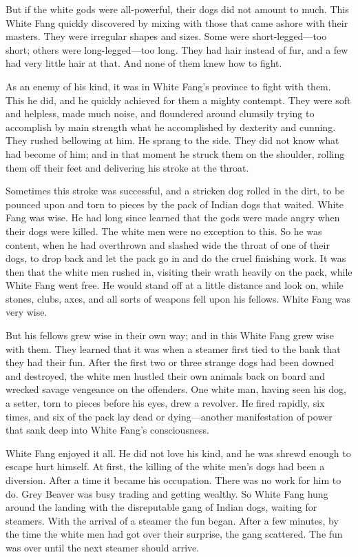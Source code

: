 \documentclass[10pt]{book}
\begin{document}
But if the white gods were all-powerful, their dogs did not amount to
much. This White Fang quickly discovered by mixing with those that came
ashore with their masters. They were irregular shapes and sizes. Some
were short-legged—too short; others were long-legged—too long. They had
hair instead of fur, and a few had very little hair at that. And none
of them knew how to fight.

As an enemy of his kind, it was in White Fang’s province to fight with
them. This he did, and he quickly achieved for them a mighty contempt.
They were soft and helpless, made much noise, and floundered around
clumsily trying to accomplish by main strength what he accomplished by
dexterity and cunning. They rushed bellowing at him. He sprang to the
side. They did not know what had become of him; and in that moment he
struck them on the shoulder, rolling them off their feet and delivering
his stroke at the throat.

Sometimes this stroke was successful, and a stricken dog rolled in the
dirt, to be pounced upon and torn to pieces by the pack of Indian dogs
that waited. White Fang was wise. He had long since learned that the
gods were made angry when their dogs were killed. The white men were no
exception to this. So he was content, when he had overthrown and
slashed wide the throat of one of their dogs, to drop back and let the
pack go in and do the cruel finishing work. It was then that the white
men rushed in, visiting their wrath heavily on the pack, while White
Fang went free. He would stand off at a little distance and look on,
while stones, clubs, axes, and all sorts of weapons fell upon his
fellows. White Fang was very wise.

But his fellows grew wise in their own way; and in this White Fang grew
wise with them. They learned that it was when a steamer first tied to
the bank that they had their fun. After the first two or three strange
dogs had been downed and destroyed, the white men hustled their own
animals back on board and wrecked savage vengeance on the offenders.
One white man, having seen his dog, a setter, torn to pieces before his
eyes, drew a revolver. He fired rapidly, six times, and six of the pack
lay dead or dying—another manifestation of power that sank deep into
White Fang’s consciousness.

White Fang enjoyed it all. He did not love his kind, and he was shrewd
enough to escape hurt himself. At first, the killing of the white men’s
dogs had been a diversion. After a time it became his occupation. There
was no work for him to do. Grey Beaver was busy trading and getting
wealthy. So White Fang hung around the landing with the disreputable
gang of Indian dogs, waiting for steamers. With the arrival of a
steamer the fun began. After a few minutes, by the time the white men
had got over their surprise, the gang scattered. The fun was over until
the next steamer should arrive.
\end{document}
